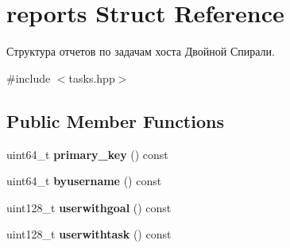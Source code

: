 \hypertarget{structreports}{}\section{reports Struct Reference}
\label{structreports}


Структура отчетов по задачам хоста Двойной Спирали.  




{\ttfamily \#include $<$tasks.\+hpp$>$}

\subsection*{Public Member Functions}
\begin{DoxyCompactItemize}
\item 
\mbox{\label{structreports_a0b0beed81a1d2322a58a6d1656a1ad8e}} 
uint64\+\_\+t {\bfseries primary\+\_\+key} () const
\item 
\mbox{\label{structreports_a6dcfa6279045344191b2425687b39d72}} 
uint64\+\_\+t {\bfseries byusername} () const
\item 
\mbox{\label{structreports_aeaed944312dfa02d976309fe2e781db5}} 
uint128\+\_\+t {\bfseries userwithgoal} () const
\item 
\mbox{\label{structreports_a05c5e63311eaa45d8bd8361dc0354d4a}} 
uint128\+\_\+t {\bfseries userwithtask} () const
\end{DoxyCompactItemize}
